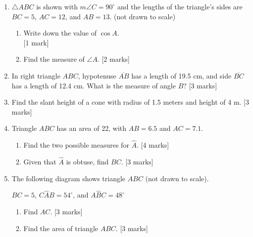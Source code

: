 \documentclass[12pt, twoside]{article}
\begin{document}
\begin{enumerate}
\item $\triangle ABC$ is shown with $m\angle C=90^\circ$ and the lengths of the triangle's sides are $BC=5$, $AC=12$, and $AB=13$. (not drawn to scale)
  \begin{multicols}{2}
        \begin{enumerate}
        \item Write down the value of $\cos A$.  \\ \hfill [1 mark]\vspace{0.5cm}
        \item Find the measure of $\angle A$.  \hfill [2 marks] \vspace{1cm}
      \end{enumerate}
    \end{multicols}

\item In right triangle $ABC$, hypotenuse $\overline{AB}$ has a length of 19.5 cm, and side $\overline{BC}$ has a length of 12.4 cm. What is the measure of angle $B$? \hfill [3 marks]
  
\item Find the slant height of a cone with radius of 1.5 meters and height of 4 m. \hfill [3 marks]
  
\item Triangle $ABC$ has an area of 22, with $AB=6.5$ and $AC=7.1$. 
  \begin{enumerate}
    \item Find the two possible measures for $\hat{A}$. \hfill [4 marks]
    \item Given that $\hat{A}$ is obtuse, find $BC$. \hfill [3 marks]
  \end{enumerate}

   \newpage

\item The following diagram shows triangle $ABC$ (not drawn to scale).
  \begin{center}
    \end{center} 
    $BC=5$, $C\hat{A}B=54^\circ$, and $A\hat{B}C=48^\circ$
    \begin{enumerate}
      \item Find $AC$. \hfill [3 marks]
      \item Find the area of triangle $ABC$. \hfill [3 marks]
    \end{enumerate}


\end{enumerate}
\end{document}
